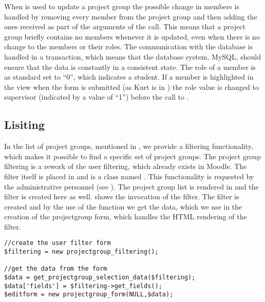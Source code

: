 When  is used to update a project group the possible change in members is handled by removing every member from the project group and then adding the ones received as part of the arguments of the call.
This means that a project group briefly contains no members whenever it is updated, even when there is no change to the members or their roles.
The communication with the database is handled in a transaction, which means that the database system, MySQL, should ensure that the data is constantly in a consistent state.
The role of a member is as standard set to ``0'', which indicates a student. 
If a member is highlighted in the view when the form is submitted (as Kurt is in ) the role value is changed to supervisor (indicated by a value of ``1'') before the call to .


\subsection{Lisiting}
In the list of project groups, mentioned in , we provide a filtering functionality, which makes it possible to find a specific set of project groups.
The project group filtering is a rework of the user filtering, which already exists in Moodle.
The filter itself is placed in  and is a class named .
This functionality is requested by the administrative personnel (see ).
The project group list is rendered in  and the filter is created here as well. 
 shows the invocation of the filter. 
The filter is created and by the use of the function  we get the data, which we use in the creation of the projectgroup form, which handles the HTML rendering of the filter. 
\begin{lstlisting}[style=phpCode, caption=\myCaption{The invocation of the filtering mechanism}, label=moodlefiltering]
//create the user filter form
$filtering = new projectgroup_filtering();

//get the data from the form
$data = get_projectgroup_selection_data($filtering);
$data['fields'] = $filtering->get_fields();
$editform = new projectgroup_form(NULL,$data);
\end{lstlisting}\begin{comment}$\end{comment}

